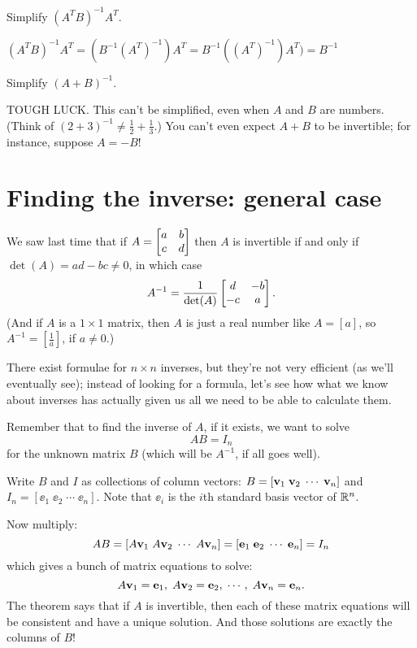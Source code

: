 \begin{myprob} Simplify  $(A^T B)^{-1}A^T$.

\begin{mysol} $(A^T B)^{-1}A^T = (B^{-1} (A^T)^{-1}) A^T = B^{-1} ((A^T)^{-1}) A^T) =B^{-1}$
\end{mysol}\end{myprob}

\begin{myprob} Simplify $(A+B)^{-1}$.

\begin{mysol} TOUGH LUCK.  This can't be simplified, even when $A$ and $B$ are
numbers.  (Think of $(2+3)^{-1} \neq \frac12 + \frac13$.)  You can't 
even expect $A+B$ to be invertible; for instance, suppose $A = -B$! \end{mysol}\end{myprob}


 


\section{Finding the inverse: general case}

We saw last time that if $A = \left[ \begin{matrix} a&b\\c&d \end{matrix} \right]$ then $A$ is 
invertible if and only if $\det(A) = ad-bc \neq 0$, in
which case
$$
A^{-1} = \frac{1}{\det(A)}\left[ \begin{matrix} d & -b\\-c&a \end{matrix} \right].
$$
(And if $A$ is a $1 \times 1$ matrix, then $A$ is just a real
number like $A = [a]$, so $A^{-1} = [\frac{1}{a}]$, if $a \neq 0$.)

There exist formulae for $n \times n$ inverses, but they're 
not very efficient (as we'll eventually see); instead of looking
for a formula, let's see how what we know about inverses has
actually given us all we need to be able to calculate them.


Remember that to find the inverse of $A$, if it exists, we want to solve
$$
A B = I_n
$$
for the unknown matrix $B$ (which will be $A^{-1}$, if all goes well).

Write $B$ and $I$ as collections of column vectors:
$B = [\mathbf{v}_1 \; \mathbf{v}_2 \; \cdots \; \mathbf{v}_n]$ and
$I_n = [\ee_1 \; \ee_2 \; \cdots \; \ee_n]$.  Note that  $\ee_i$ is
the $i$th standard basis vector of $\mathbb{R}^n$.

Now multiply:
$$
AB = [A\mathbf{v}_1 \; A\mathbf{v}_2 \; \cdots \; A\mathbf{v}_n] = [\mathbf{e}_1 \; \mathbf{e}_2 \; \cdots \; \mathbf{e}_n] = I_n
$$
which gives a bunch of matrix equations to solve:
$$
A\mathbf{v}_1 = \mathbf{e}_1, \; A\mathbf{v}_2 = \mathbf{e}_2,\; \cdots, \; A\mathbf{v}_n = \mathbf{e}_n.
$$
The theorem says that if $A$ is invertible, then each of these
matrix equations  will
be consistent and have a unique solution.  And those
solutions are exactly the columns of $B$!

